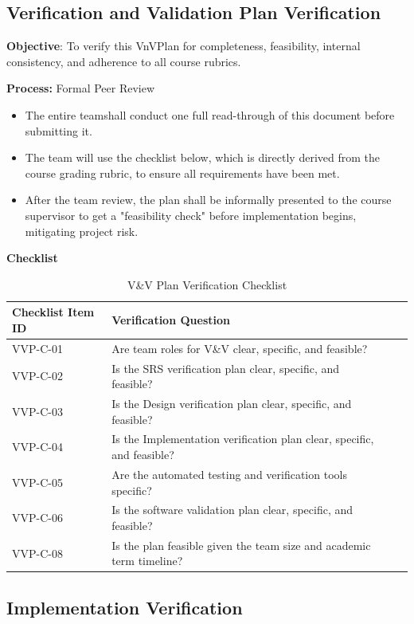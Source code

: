 \documentclass[12pt, titlepage]{article}
\begin{document}
\subsection{Verification and Validation Plan Verification}

\noindent \textbf{Objective}: To verify this VnVPlan for completeness, feasibility, internal consistency, and adherence to all course rubrics.

\noindent \textbf{Process:} Formal Peer Review
\begin{itemize}
	\item The entire teamshall conduct one full read-through of this document before submitting it.
	\item The team will use the checklist below, which is directly derived from the course grading rubric, to ensure all requirements have been met.
	\item After the team review, the plan shall be informally presented to the course supervisor to get a "feasibility check" before implementation begins, mitigating project risk.
\end{itemize}

\noindent \textbf{Checklist}
\begin{table}[H]
\centering
\caption{V\&V Plan Verification Checklist}
\label{tab:vvp-checklist}
\begin{tabular}{|l|p{}|l|l|}
\hline
\textbf{Checklist Item ID} & \textbf{Verification Question} \\ \hline
VVP-C-01 & Are team roles for V\&V clear, specific, and feasible? \\ \hline
VVP-C-02 & Is the SRS verification plan clear, specific, and feasible? \\ \hline
VVP-C-03 & Is the Design verification plan clear, specific, and feasible? \\ \hline
VVP-C-04 & Is the Implementation verification plan clear, specific, and feasible? \\ \hline
VVP-C-05 & Are the automated testing and verification tools specific?  \\ \hline
VVP-C-06 & Is the software validation plan clear, specific, and feasible?  \\ \hline
VVP-C-08 & Is the plan feasible given the team size and academic term timeline?  \\ \hline
\end{tabular}
\end{table}

\subsection{Implementation Verification}
\end{document}
